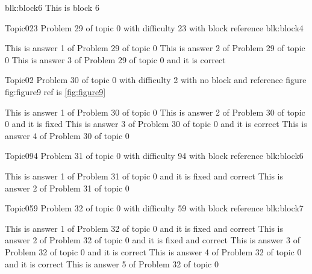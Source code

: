 \documentclass[master]{exam}
\begin{document}
\begin{block}{blk:block6}
This is block 6
\end{block}


\begin{problem}[requires=blk:block4]{Topic0}{23}
	Problem 29 of topic 0 with difficulty 23 with block reference blk:block4
	\begin{answers}
		\answer This is answer 1 of Problem 29 of topic 0 
		\answer This is answer 2 of Problem 29 of topic 0 
		\answer[correct] This is answer 3 of Problem 29 of topic 0 and it is correct
	\end{answers}
\end{problem}

\begin{problem}{Topic0}{2}
	Problem 30 of topic 0 with difficulty 2 with no block and reference figure fig:figure9 ref is \ref{fig:figure9}
	\begin{answers}
		\answer This is answer 1 of Problem 30 of topic 0 
		\answer[fixed] This is answer 2 of Problem 30 of topic 0 and it is fixed
		\answer[correct] This is answer 3 of Problem 30 of topic 0 and it is correct
		\answer This is answer 4 of Problem 30 of topic 0 
	\end{answers}
\end{problem}

\begin{problem}[requires=blk:block6]{Topic0}{94}
	Problem 31 of topic 0 with difficulty 94 with block reference blk:block6
	\begin{answers}
		 This is answer 1 of Problem 31 of topic 0 and it is fixed and correct
		\answer This is answer 2 of Problem 31 of topic 0 
	\end{answers}
\end{problem}

\begin{problem}[requires=blk:block7]{Topic0}{59}
	Problem 32 of topic 0 with difficulty 59 with block reference blk:block7
	\begin{answers}
		 This is answer 1 of Problem 32 of topic 0 and it is fixed and correct
		 This is answer 2 of Problem 32 of topic 0 and it is fixed and correct
		\answer[correct] This is answer 3 of Problem 32 of topic 0 and it is correct
		\answer[correct] This is answer 4 of Problem 32 of topic 0 and it is correct
		\answer This is answer 5 of Problem 32 of topic 0 
	\end{answers}
\end{problem}
\end{document}

